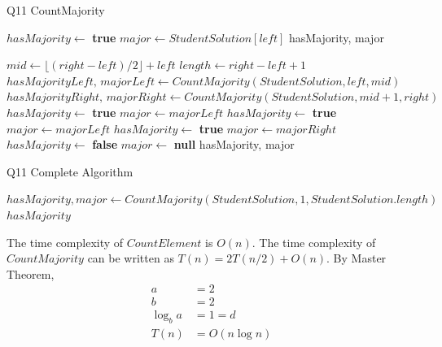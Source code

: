 \documentclass[10.5pt]{article}
\begin{document}
\begin{algorithm}[H]
	\caption{Q11 CountMajority}
	\begin{algorithmic}[1]
				\State $hasMajority \gets $ \textbf{true}
				\State $major \gets StudentSolution[left]$
				\State \Return hasMajority, major
			\EndIf
		\end{algorithmic}
	\end{algorithm}
	\begin{algorithm}[H]
		\begin{algorithmic}[1]
			\State $mid \gets \lfloor (right - left) / 2\rfloor + left$
			\State $length \gets right - left + 1$
			\State $hasMajorityLeft,\,majorLeft \gets CountMajority(StudentSolution, left, mid)$
			\State $hasMajorityRight,\,majorRight \gets CountMajority(StudentSolution, mid + 1, right)$
				\State $hasMajority \gets $ \textbf{true}
				\State $major \gets majorLeft$
				\State $hasMajority \gets $ \textbf{true}
				\State $major \gets majorLeft$
				\State $hasMajority \gets $ \textbf{true}
				\State $major \gets majorRight$
			\Else
				\State $hasMajority \gets $ \textbf{false}
				\State $major \gets$ \textbf{null}
			\EndIf
			\State \Return hasMajority, major
		\EndFunction
	\end{algorithmic}
\end{algorithm}


\begin{algorithm}[H]
	\caption{Q11 Complete Algorithm}
	\begin{algorithmic}[1]
			\State $hasMajority, major \gets CountMajority(StudentSolution, 1, StudentSolution.length)$
			\State \Return $hasMajority$
		\EndFunction
	\end{algorithmic}
\end{algorithm}

The time complexity of $CountElement$ is $O(n)$. The time complexity of $CountMajority$ can be written as $T(n) = 2T(n / 2) + O(n)$. By Master Theorem, 
\begin{align*}
	a &= 2\\
	b &= 2\\
	\log_b a &= 1 = d \\
T(n) &= O(n \log n)
\end{align*}
\end{document}
